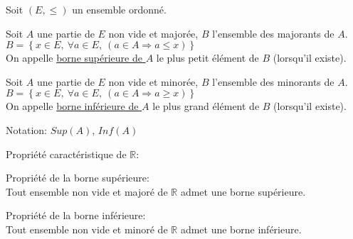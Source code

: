 \documentclass[12pt,twoside,a4paper]{article}
\begin{document}
			\begin{defi}
				Soit $(E,\leqslant)$ un ensemble ordonn\'e.
				\begin{liste}
					\item Soit $A$ une partie de $E$ non vide et major\'ee, $B$ l'ensemble des majorants de $A$.\\
						$B=\left\{x\in E,\ \forall a\in E,\ (a\in A\Rightarrow a\leqslant x) \right\}$\\
						On appelle \underline{borne sup\'erieure de $A$} le plus petit \'el\'ement de $B$ (lorsqu'il existe).
					\item  Soit $A$ une partie de $E$ non vide et minor\'ee, $B$ l'ensemble des minorants de $A$.\\
						$B=\left\{x\in E,\ \forall a\in E,\ (a\in A\Rightarrow a\geqslant x) \right\}$\\
						On appelle \underline{borne inf\'erieure de $A$} le plus grand \'el\'ement de $B$ (lorsqu'il existe).
				\end{liste}
			\end{defi}
			Notation: $Sup(A)$, $Inf(A)$\\
			\begin{prop}
				Propri\'et\'e caract\'eristique de $\mathbb{R}$:
				\begin{liste}
					\item Propri\'et\'e de la borne sup\'erieure:\\
						Tout ensemble non vide et major\'e de $\mathbb{R}$ admet une borne sup\'erieure.
					\item Propri\'et\'e de la borne inf\'erieure:\\
						Tout ensemble non vide et minor\'e de $\mathbb{R}$ admet une borne inf\'erieure.
				\end{liste}
			\end{prop}
\end{document}
